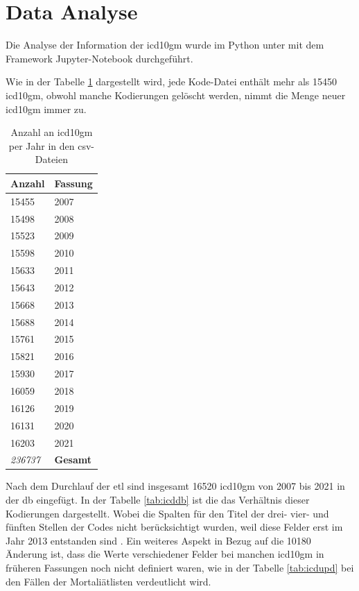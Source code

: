 \section{Data Analyse} \label{dataanalysis}
Die Analyse der Information der \ac{icd10gm} wurde im Python unter mit dem Framework Jupyter-Notebook durchgeführt. 

Wie in der Tabelle \ref{tab:icdfiles} dargestellt wird, jede Kode-Datei enthält mehr als \textsf{15450} \ac{icd10gm}, obwohl manche Kodierungen gelöscht werden, nimmt die Menge neuer \ac{icd10gm} immer zu.

\begin{table}[ht]
	\centering
	\small
	\caption[\acs{icd10gm} in den \acs{csv}-Dateien]{Anzahl an \acs{icd10gm} per Jahr in den \ac{csv}-Dateien}
	\label{tab:icdfiles}
	\begin{tabular}{|l|l|}
		\hline
	\rowcolor{lightgray} Anzahl & Fassung \\ \hline 
		15455 & 2007 \\ \hline
		15498 & 2008 \\ \hline
		15523 & 2009 \\ \hline
		15598 & 2010 \\ \hline
		15633 & 2011 \\ \hline
		15643 & 2012 \\ \hline
		15668 & 2013 \\ \hline
		15688 & 2014 \\ \hline
		15761 & 2015 \\ \hline
		15821 & 2016 \\ \hline
		15930 & 2017 \\ \hline
		16059 & 2018 \\ \hline
		16126 & 2019 \\ \hline
		16131 & 2020 \\ \hline
		16203 & 2021 \\ \hline
		\hline
		\textit{236737} & \textbf{Gesamt} \\ \hline
	\end{tabular}
	\end{table}

Nach dem Durchlauf der \ac{etl} sind insgesamt \textsf{16520} \ac{icd10gm} von 2007 bis 2021 in der \ac{db} eingefügt. In der Tabelle \ref{tab:icddb} ist die das Verhältnis dieser Kodierungen dargestellt. Wobei die Spalten für den Titel der drei- vier- und fünften Stellen der Codes nicht berücksichtigt wurden, weil diese Felder erst im Jahr 2013 entstanden sind \cite{readme13}. Ein weiteres Aspekt in Bezug auf die \textsf{10180} Änderung ist, dass die Werte verschiedener Felder  bei manchen \ac{icd10gm} in früheren Fassungen noch nicht definiert waren, wie in der Tabelle \ref{tab:icdupd} bei den Fällen der Mortaliätlisten verdeutlicht wird.

